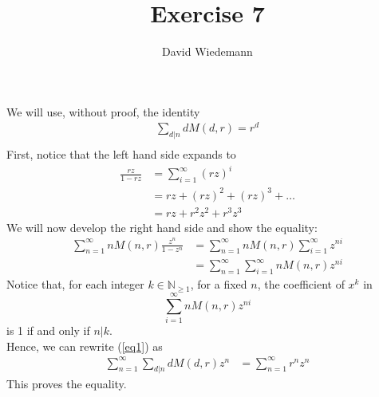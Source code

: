 \documentclass[11pt, a4paper]{article}
\begin{document}
\title{Exercise 7}
\author{David Wiedemann}
\maketitle
We will use, without proof, the identity 
\begin{align*}
	\sum_{d|n}^{ } d M( d,r) = r^{d}\\
\end{align*}
First, notice that the left hand side expands to
\begin{align*}
	\frac{rz}{1-rz} &= \sum_{i=1}^{ \infty } ( rz) ^{i}\\
			&= rz + ( rz) ^{2} + ( rz) ^{3} + \ldots\\
			&= rz + r^{2}z^{2} + r^{3}z^{3}
\end{align*}
We will now develop the right hand side and show the equality:
\begin{align}
	\sum_{n=1}^{ \infty } n M( n,r)  \frac{z^{n}}{1-z^{n}} &= \sum_{n=1}^{ \infty } n M( n,r) \sum_{i=1}^{ \infty } z^{ni}\nonumber\\
							       &= \sum_{n=1}^{ \infty } \sum_{i=1}^{ \infty } n M( n,r) z^{ni} \label{eq1}
\end{align}
Notice that, for each integer $k \in \mathbb{N}_{ \geq 1} $, for a fixed $n$, the coefficient of $x^{k}$ in
\[ 
	\sum_{i=1}^{ \infty } n M( n,r) z^{ni}
\]
is 1 if and only if $n|k$.\\
Hence, we can rewrite   (\ref{eq1}) as 
\begin{align*}
\sum_{n=1}^{ \infty } \sum_{d|n}^{ } d M( d,r)  z^{n} &= \sum_{n=1}^{ \infty } r^{n} z^{n}
\end{align*}
This proves the equality.
\end{document}
